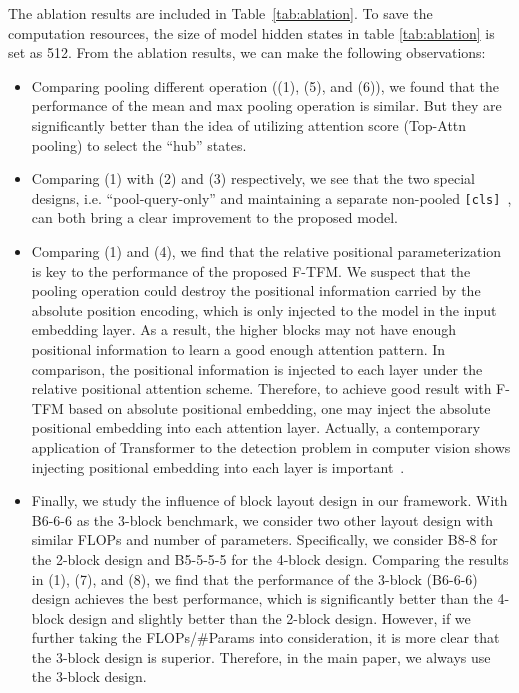 \documentclass{article}
\theoremstyle{custom}
\newcommand{\cls}{\texttt{[cls]}~}
\begin{document}
The ablation results are included in Table~\ref{tab:ablation}. 
To save the computation resources, the size of model hidden states in table \ref{tab:ablation} is set as 512. 
From the ablation results, we can make the following observations:
\begin{itemize}[leftmargin=*]
	\item Comparing pooling different operation ((1), (5), and (6)), we found that the performance of the mean and max pooling operation is similar.
	But they are significantly better than the idea of utilizing attention score (Top-Attn pooling) to select the ``hub'' states.
	
	\item Comparing (1) with (2) and (3) respectively, we see that the two special designs, i.e. ``pool-query-only'' and maintaining a separate non-pooled \cls, can both bring a clear improvement to the proposed model.
	
	\item Comparing (1) and (4), we find that the relative positional parameterization is key to the performance of the proposed F-TFM.
	We suspect that the pooling operation could destroy the positional information carried by the absolute position encoding, which is only injected to the model in the input embedding layer.
	As a result, the higher blocks may not have enough positional information to learn a good enough attention pattern.
	In comparison, the positional information is injected to each layer under the relative positional attention scheme.
	Therefore, to achieve good result with F-TFM based on absolute positional embedding, one may inject the absolute positional embedding into each attention layer.
	Actually, a contemporary application of Transformer to the detection problem in computer vision shows injecting positional embedding into each layer is important~\cite{Carion2020EndtoEndOD}.
	
	\item Finally, we study the influence of block layout design in our framework.
	With B6-6-6 as the 3-block benchmark, we consider two other layout design with similar FLOPs and number of parameters. Specifically, we consider B8-8 for the 2-block design and B5-5-5-5 for the 4-block design.
	Comparing the results in (1), (7), and (8), we find that the performance of the 3-block (B6-6-6) design achieves the best performance, which is significantly better than the 4-block design and slightly better than the 2-block design.
	However, if we further taking the FLOPs/\#Params into consideration, it is more clear that the 3-block design is superior.
	Therefore, in the main paper, we always use the 3-block design.
\end{itemize}
\end{document}
